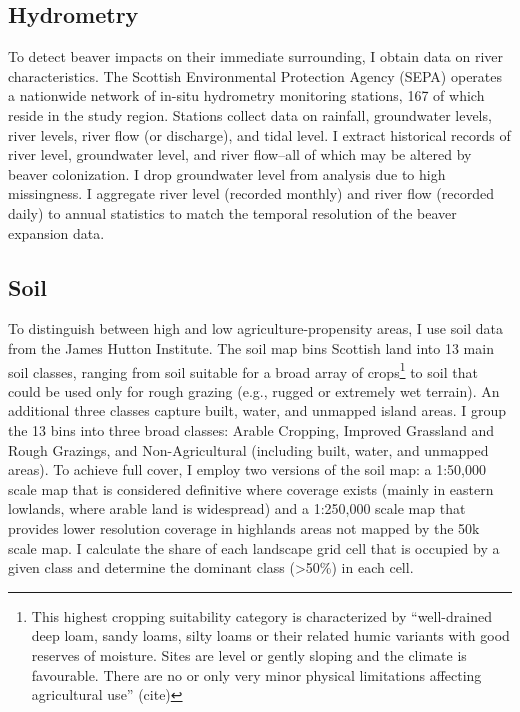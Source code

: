 \subsection{Hydrometry}
To detect beaver impacts on their immediate surrounding, I obtain data on river characteristics. The Scottish Environmental Protection Agency (SEPA) operates a nationwide network of in-situ hydrometry monitoring stations, 167 of which reside in the study region. Stations collect data on rainfall, groundwater levels, river levels, river flow (or discharge), and tidal level. I extract historical records of river level, groundwater level, and river flow--all of which may be altered by beaver colonization. I drop groundwater level from analysis due to high missingness. I aggregate river level (recorded monthly) and river flow (recorded daily) to annual statistics to match the temporal resolution of the beaver expansion data.

\subsection{Soil}


To distinguish between high and low agriculture-propensity areas, I use soil data from the James Hutton Institute. The soil map bins Scottish land into 13 main soil classes, ranging from soil suitable for a broad array of crops\footnote{This highest cropping suitability category is characterized by ``well-drained deep loam, sandy loams, silty loams or their related humic variants with good reserves of moisture. Sites are level or gently sloping and the climate is favourable. There are no or only very minor physical limitations affecting agricultural use'' (cite)} to soil that could be used only for rough grazing (e.g., rugged or extremely wet terrain). An additional three classes capture built, water, and unmapped island areas. I group the 13 bins into three broad classes: Arable Cropping, Improved Grassland and Rough Grazings, and Non-Agricultural (including built, water, and unmapped areas). To achieve full cover, I employ two versions of the soil map: a 1:50,000 scale map that is considered definitive where coverage exists (mainly in eastern lowlands, where arable land is widespread) and a 1:250,000 scale map that provides lower resolution coverage in highlands areas not mapped by the 50k scale map. I calculate the share of each landscape grid cell that is occupied by a given class and determine the dominant class (>50\%) in each cell.

